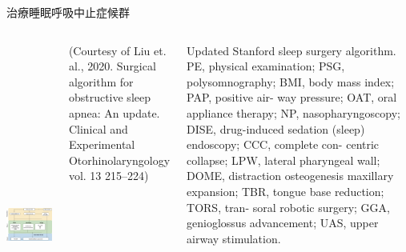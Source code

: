 \documentclass[aspectratio=169]{beamer}
\begin{document}
\begin{frame}{治療睡眠呼吸中止症候群}
\begin{columns}[onlytextwidth]


    \includegraphics[height = 12cm]{ceo-2020-01053f6.jpg}
    \par (Courtesy of Liu et. al., 2020. Surgical algorithm for obstructive sleep apnea: An update. Clinical and Experimental Otorhinolaryngology vol. 13 215–224)

    \par Updated Stanford sleep surgery algorithm. PE, physical examination; PSG, polysomnography; BMI, body mass index; PAP, positive air- way pressure; OAT, oral appliance therapy; NP, nasopharyngoscopy; DISE, drug-induced sedation (sleep) endoscopy; CCC, complete con- centric collapse; LPW, lateral pharyngeal wall; DOME, distraction osteogenesis maxillary expansion; TBR, tongue base reduction; TORS, tran- soral robotic surgery; GGA, genioglossus advancement; UAS, upper airway stimulation.\\
\end{columns}


\end{frame}
\end{document}
